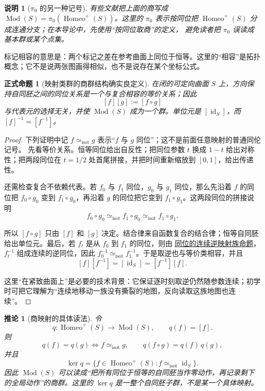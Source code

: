 \documentclass[UTF8,fontset=none,a4paper,11pt]{ctexart}
\theoremstyle{foundation-definition}
\theoremstyle{foundation-theorem}
\theoremstyle{foundation-proposition}
\newtheorem{proposition}[definition]{正式命题}
\theoremstyle{foundation-example}
\theoremstyle{foundation-remark}
\newtheorem{remark}[definition]{说明}
\theoremstyle{foundation-theorem}
\newtheorem{corollary}[definition]{推论}
\newcommand{\Mod}{\operatorname{Mod}}
\newcommand{\term}[2]{\hyperref[#1]{#2}}
\begin{document}
\begin{remark}[\(\pi_0\) 的另一种记号]\label{rem:mapping-class-pi0}
有些文献把上面的商写成
\(\Mod(S)=\pi_0(\operatorname{Homeo}^{+}(S))\)。这里的 \(\pi_0\) 表示按同位把
\(\operatorname{Homeo}^{+}(S)\) 分成连通分支；在本导论中，先使用“按同位取商”的定义，
避免读者把 \(\pi_0\) 误读成基本群或某个点集。
\end{remark}

标记相容的意思是：两个标记之差在参考曲面上同位于恒等。这里的“相容”是拓扑概念；它不是说两张图画得相似，也不是说存在某个坐标公式。

\thispagestyle{fancy}
\begin{proposition}[映射类群的商群结构确实良定义]\label{prop:mapping-class-group-well-defined}
在闭的可定向曲面 \(S\) 上，方向保持自同胚之间的同位关系是一个与复合相容的等价关系；因此
\[
 [f][g]:=[f\circ g]
\]
与代表元的选择无关，并使 \(\Mod(S)\) 成为一个群。单位元是 \([\operatorname{id}_S]\)，而
\([f]^{-1}=[f^{-1}]\)。
\end{proposition}

\begin{proof}
下列证明中记 \(f\simeq_{\mathrm{isot}}g\) 表示“\(f\) 与 \(g\) 同位”；这不是前面任意映射的普通同伦记号。
先看等价关系。恒等同位给出自反性；把同位参数 \(t\) 换成 \(1-t\) 给出对称性；把两段同位在 \(t=1/2\) 处首尾拼接，并把时间重新缩放到 \([0,1]\)，给出传递性。

还需检查复合不依赖代表。若 \(f_0\) 与 \(f_1\) 同位，\(g_0\) 与 \(g_1\) 同位，那么先沿着 \(f\) 的同位把
\(f_0\circ g_0\) 变到 \(f_1\circ g_0\)，再沿着 \(g\) 的同位把它变到
\(f_1\circ g_1\)。这两段同位的拼接说明
\[
 f_0\circ g_0\simeq_{\mathrm{isot}} f_1\circ g_0\simeq_{\mathrm{isot}} f_1\circ g_1.
\]

所以 \([f\circ g]\) 只由 \([f]\) 和 \([g]\) 决定。结合律来自函数复合的结合律；恒等自同胚给出单位元。最后，若 \(f_t\) 是从 \(f_0\) 到 \(f_1\) 的同位，则由
\term{prop:isotopy-inverse-family}{同位的连续逆映射族命题}，\(f_t^{-1}\) 组成连续的逆同位，因此 \(f_0^{-1}\simeq_{\mathrm{isot}} f_1^{-1}\)。于是取逆也与等价类相容，并且
\[
 [f][f^{-1}]=[\operatorname{id}_S]=[f^{-1}][f].
\]

这里“在紧致曲面上”是必要的技术背景：它保证逐时刻取逆仍然随参数连续；初学时可把它理解为“连续地移动一族没有撕裂的地图，反向读取这族地图也连续”。
\end{proof}

\begin{corollary}[商映射的具体读法]
令
\[
q:\operatorname{Homeo}^+(S)\longrightarrow\Mod(S),\qquad q(f)=[f].
\]
则
\[
q(f)=q(g)\iff f\simeq_{\mathrm{isot}}g,\qquad
q(f\circ g)=q(f)\,q(g),
\]
并且
\[
\ker q=\{f\in\operatorname{Homeo}^+(S):f\simeq_{\mathrm{isot}}\operatorname{id}_S\}.
\]
因此 \(\Mod(S)\) 可以读成“把所有同位于恒等的自同胚当作零动作，再记录剩下的全局动作”的商群。这里的 \(\ker q\) 是一整个自同胚子群，不是某一个具体映射。
\end{corollary}
\end{document}
